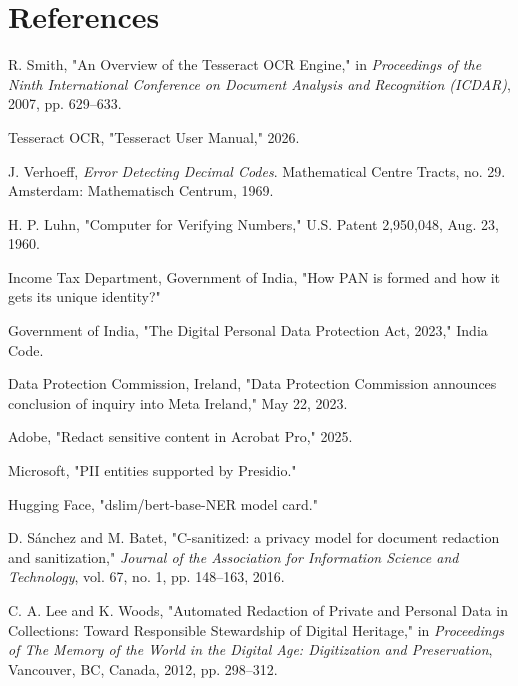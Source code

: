 \section*{References}

\begin{trivlist}\itemsep0pt
\item[1.] R. Smith, "An Overview of the Tesseract OCR Engine," in \textit{Proceedings of the Ninth International Conference on Document Analysis and Recognition (ICDAR)}, 2007, pp. 629--633.

\item[2.] Tesseract OCR, "Tesseract User Manual," 2026.

\item[3.] J. Verhoeff, \textit{Error Detecting Decimal Codes}. Mathematical Centre Tracts, no. 29. Amsterdam: Mathematisch Centrum, 1969.

\item[4.] H. P. Luhn, "Computer for Verifying Numbers," U.S. Patent 2,950,048, Aug. 23, 1960.

\item[5.] Income Tax Department, Government of India, "How PAN is formed and how it gets its unique identity?"

\item[6.] Government of India, "The Digital Personal Data Protection Act, 2023," India Code.

\item[7.] Data Protection Commission, Ireland, "Data Protection Commission announces conclusion of inquiry into Meta Ireland," May 22, 2023.

\item[8.] Adobe, "Redact sensitive content in Acrobat Pro," 2025.

\item[9.] Microsoft, "PII entities supported by Presidio."

\item[10.] Hugging Face, "dslim/bert-base-NER model card."

\item[11.] D. S{\'a}nchez and M. Batet, "C-sanitized: a privacy model for document redaction and sanitization," \textit{Journal of the Association for Information Science and Technology}, vol. 67, no. 1, pp. 148--163, 2016.

\item[12.] C. A. Lee and K. Woods, "Automated Redaction of Private and Personal Data in Collections: Toward Responsible Stewardship of Digital Heritage," in \textit{Proceedings of The Memory of the World in the Digital Age: Digitization and Preservation}, Vancouver, BC, Canada, 2012, pp. 298--312.


\end{trivlist}
